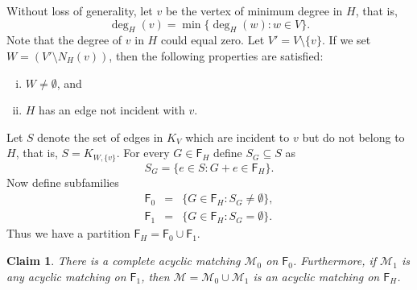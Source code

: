 \documentclass[10pt]{amsart}
\newcommand{\MM}{\mathcal{M}}
\newtheorem{claim}[thm]{Claim}
\theoremstyle{definition}
\begin{document}
	Without loss of generality, let $v$ be the vertex of minimum degree in $H$, that is, \[\deg_{H}(v)=\min\{\deg_H(w):w\in V\}.\] Note that the degree of $v$ in $H$ could equal zero. Let $V'=V\setminus \{v\}$. If we set $W = (V'\setminus N_H(v))$, 
	then the following properties are satisfied:
	\begin{enumerate}[(i)]
		\item $W\neq\emptyset$, and
		\item \label{non-triv-H} $H$ has an edge not incident with $v$.
	\end{enumerate}
	Let $S$ denote the set of edges in $K_V$ which are incident to $v$ but do not belong to $H$, that is, $S = K_{W, \{v\}}$.
	For every $G\in \mathsf{F}_H$ define $S_G\subseteq S$ as
	\[S_G=\{e\in S: G+e \in \mathsf{F}_H\}.\]
	Now define subfamilies
	\[\begin{array}{lcr}
	\mathsf{F}_0 & = & \{G\in \mathsf{F}_H : S_G \ne \emptyset \}, \\
	\mathsf{F}_1 & = & \{G\in \mathsf{F}_H : S_G = \emptyset \}.
	\end{array}\]
	Thus we have a partition $\mathsf{F}_H = \mathsf{F}_0 \cup \mathsf{F}_1$.
	
	\begin{claim} \label{step0}
		There is a complete acyclic matching $\MM_0$ on $\mathsf{F}_0$. Furthermore, if $\MM_1$ is any acyclic matching on $\mathsf{F}_1$, then $\MM=\MM_0 \cup \MM_1$ is an acyclic matching on $\mathsf{F}_H$.
	\end{claim}
	
	
	
	
	
\end{document}
